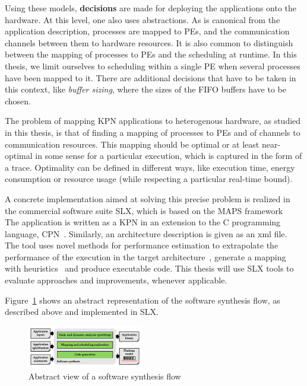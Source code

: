\documentclass[sigplan,10pt]{acmart}
\begin{document}
Using these models, \textbf{decisions} are made for deploying the applications onto the hardware. At this level,
one also uses abstractions. As is canonical from the application description, processes are mapped to PEs, 
and the communication channels between them to hardware resources. It is also common to distinguish between the mapping of
processes to PEs and the scheduling at runtime.
In this thesis, we limit ourselves to scheduling within a single PE when several processes have been mapped to it.
There are additional decisions that have to be taken in this context, like \emph{buffer sizing}, where the sizes of the
FIFO buffers have to be chosen. 

The problem of mapping KPN applications to heterogenous hardware, as studied in this thesis, is that of
finding a mapping of processes to PEs and of channels to communication resources. 
This mapping should be optimal or at least near-optimal in some sense for a particular execution, which is captured in the form of a trace.
Optimality can be defined in different ways, like execution time, energy consumption or resource usage (while respecting a particular real-time bound).

A concrete implementation aimed at solving this precise problem is realized in the commercial software suite SLX, which is based on the MAPS framework~\cite{maps08,castrillon14_springer}
The application is written as a KPN in an extension to the C programming language, CPN~\cite{sheng2014_cpn}. Similarly, an architecture description is given as an xml file.
The tool uses novel methods for performance estimation to extrapolate the performance of the execution in the target architecture~\cite{TRETS_eusse14}, generate a mapping with heuristics~\cite{castrillon2012,castrillon_industrial_informatics} and produce executable code.
This thesis will use SLX tools to evaluate approaches and improvements, whenever applicable.

Figure~\ref{fig:synthesisflow} shows an abstract representation of the software synthesis flow, as described above and implemented in SLX.
\begin{figure}[h]
	\centering
	\includegraphics[width=0.45\textwidth]{figures/synthesisflow.pdf}
	\caption{Abstract view of a software synthesis flow}
	\label{fig:synthesisflow}
\end{figure}
\end{document}
